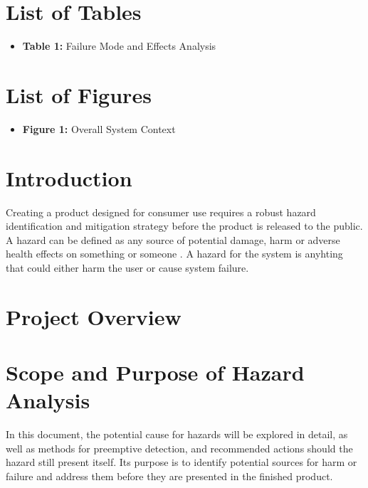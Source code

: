 \documentclass{article}
\begin{document}
\section{List of Tables}
\begin{itemize}
    \item \textbf{Table 1:} Failure Mode and Effects Analysis
\end{itemize}

\section{List of Figures}
\begin{itemize}
    \item \textbf{Figure 1:} Overall System Context
\end{itemize}

\section{Introduction}{
    Creating a product designed for consumer use requires a robust hazard identification and mitigation strategy before the 
    product is released to the public. A hazard can be defined as any source of potential damage, harm or adverse health effects 
    on something or someone \cite{CCOHS}. A hazard for the \progname{} system is anyhting that could either harm the user or cause system failure.
}

\section{Project Overview}
\projectoverview

\section{Scope and Purpose of Hazard Analysis}{
    In this document, the potential cause for hazards will be explored in detail, as well as methods for preemptive detection, 
    and recommended actions should the hazard still present itself. Its purpose is to identify potential sources for harm or 
    failure and address them before they are presented in the finished product.
}
\end{document}
